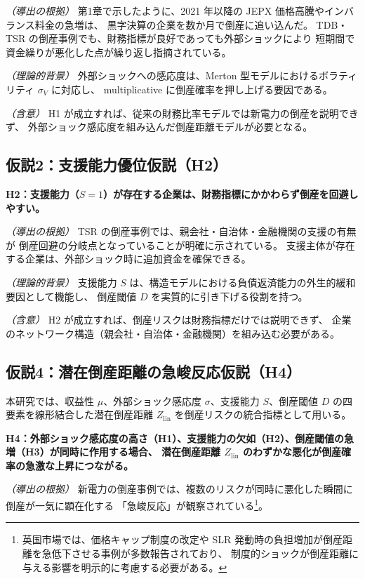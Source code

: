 \textit{（導出の根拠）}  
第1章で示したように、2021 年以降の JEPX 価格高騰やインバランス料金の急増は、
黒字決算の企業を数か月で倒産に追い込んだ。
TDB・TSR の倒産事例でも、財務指標が良好であっても外部ショックにより
短期間で資金繰りが悪化した点が繰り返し指摘されている。

\textit{（理論的背景）}  
外部ショックへの感応度は、Merton 型モデルにおけるボラティリティ $\sigma_V$ に対応し、
multiplicative に倒産確率を押し上げる要因である。

\textit{（含意）}  
H1 が成立すれば、従来の財務比率モデルでは新電力の倒産を説明できず、
外部ショック感応度を組み込んだ倒産距離モデルが必要となる。

\bigskip

\subsection*{仮説2：支援能力優位仮説（H2）}

\textbf{H2：支援能力（$S = 1$）が存在する企業は、財務指標にかかわらず倒産を回避しやすい。}

\textit{（導出の根拠）}  
TSR の倒産事例では、親会社・自治体・金融機関の支援の有無が
倒産回避の分岐点となっていることが明確に示されている。
支援主体が存在する企業は、外部ショック時に追加資金を確保できる。

\textit{（理論的背景）}  
支援能力 $S$ は、構造モデルにおける負債返済能力の外生的緩和要因として機能し、
倒産閾値 $D$ を実質的に引き下げる役割を持つ。

\textit{（含意）}  
H2 が成立すれば、倒産リスクは財務指標だけでは説明できず、
企業のネットワーク構造（親会社・自治体・金融機関）を組み込む必要がある。

\bigskip

\subsection*{仮説4：潜在倒産距離の急峻反応仮説（H4）}

本研究では、収益性 $\mu$、外部ショック感応度 $\sigma$、支援能力 $S$、倒産閾値 $D$
の四要素を線形結合した潜在倒産距離 $Z_{\text{lin}}$ を倒産リスクの統合指標として用いる。

\textbf{H4：外部ショック感応度の高さ（H1）、支援能力の欠如（H2）、倒産閾値の急増（H3）が同時に作用する場合、
潜在倒産距離 $Z_{\text{lin}}$ のわずかな悪化が倒産確率の急激な上昇につながる。}

\textit{（導出の根拠）}
新電力の倒産事例では、複数のリスクが同時に悪化した瞬間に倒産が一気に顕在化する
「急峻反応」が観察されている\footnote{
英国市場では、価格キャップ制度の改定や SLR 発動時の負担増加が倒産距離を急低下させる事例が多数報告されており、
制度的ショックが倒産距離に与える影響を明示的に考慮する必要がある。
}。


